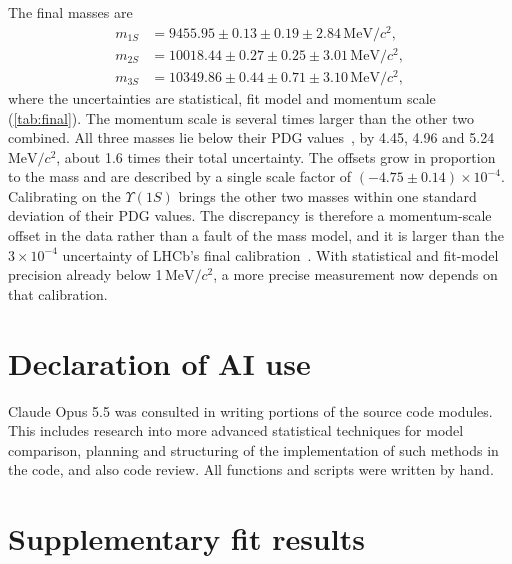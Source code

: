 \documentclass[a4paper,11pt]{article}
\newcommand{\MeVcc}{\ensuremath{\mathrm{MeV}/c^2}}
\newcommand{\Ups}[1]{\ensuremath{\Upsilon(#1)}}               %
\begin{document}
The final masses are
\begin{align*}
    m_{1S} &= 9455.95 \pm 0.13 \pm 0.19 \pm 2.84\,\MeVcc, \\
    m_{2S} &= 10018.44 \pm 0.27 \pm 0.25 \pm 3.01\,\MeVcc, \\
    m_{3S} &= 10349.86 \pm 0.44 \pm 0.71 \pm 3.10\,\MeVcc,
\end{align*}
where the uncertainties are statistical, fit model and momentum scale (\cref{tab:final}).
The momentum scale is several times larger than the other two combined.
All three masses lie below their PDG values~\cite{ParticleDataGroup:2024cfk}, by 4.45, 4.96 and 5.24\,\MeVcc{}, about 1.6 times their total uncertainty.
The offsets grow in proportion to the mass and are described by a single scale factor of $(-4.75 \pm 0.14)\times10^{-4}$.
Calibrating on the \Ups{1S} brings the other two masses within one standard deviation of their PDG values.
The discrepancy is therefore a momentum-scale offset in the data rather than a fault of the mass model, and it is larger than the $3\times10^{-4}$ uncertainty of LHCb's final calibration~\cite{LHCb:2023ood}.
With statistical and fit-model precision already below 1\,\MeVcc{}, a more precise measurement now depends on that calibration.

\section*{Declaration of AI use}

Claude Opus 5.5 was consulted in writing portions of the source code modules. This includes research into more advanced statistical techniques for model comparison, planning and structuring of the implementation of such methods in the code, and also code review. All functions and scripts were written by hand.

\printbibliography[heading=bibintoc, title={References}]

\appendix

\section{Supplementary fit results}
\label{app:fits}
\end{document}
